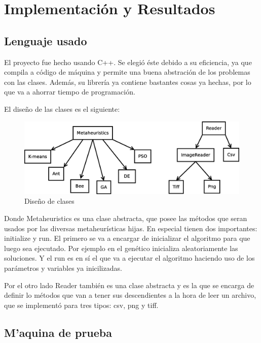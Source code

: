 \chapter{Implementaci\'on y Resultados} \label{chap:impresultados}

\vspace{5 mm}

\section{Lenguaje usado}  \label{sec:lusado}

El proyecto fue hecho usando C++. Se elegi\'o \'este debido 
a su eficiencia, ya que compila a c\'odigo de m\'aquina y permite una buena
abstraci\'on de los problemas con las clases. Adem\'as, su librer\'ia ya contiene bastantes
cosas ya hechas, por lo que va a ahorrar tiempo de programaci\'on.

El dise\~no de las clases es el siguiente:

\begin{figure}[htb]
\centering
\includegraphics[scale=0.35]{figures/clases.eps}
\caption{Dise\~no de clases}
\label{fig:jclases}
\end{figure}

Donde Metaheuristics es una clase abstracta, que posee las m\'etodos que seran
usados por las diversas metaheur\'isticas hijas. En especial tienen dos 
importantes: initialize y run. El primero se va a encargar de inicializar el algoritmo
para que luego sea ejecutado. Por ejemplo en el gen\'etico inicializa aleatoriamente
las soluciones. Y el run es en s\'i el que va a ejecutar el algoritmo haciendo 
uso de los par\'ametros y variables ya inicilizadas.

Por el otro lado Reader tambi\'en
es una clase abstracta y es la que se encarga de definir lo m\'etodos que van a 
tener sus descendientes a la hora de leer un archivo, que se implement\'o para 
tres tipos: csv, png y tiff.

\section{M'aquina de prueba} \label{sect:testbed}

